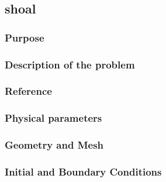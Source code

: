 \subsection{shoal}
%

%    
\subsubsection{Purpose}
%

%
\subsubsection{Description of the problem}
%

%    
%
\subsubsection{Reference}
%

%
%
\subsubsection{Physical parameters}
%

%
%
\subsubsection{Geometry and Mesh}
%

%
%
\subsubsection{Initial and Boundary Conditions}
%

%
%
